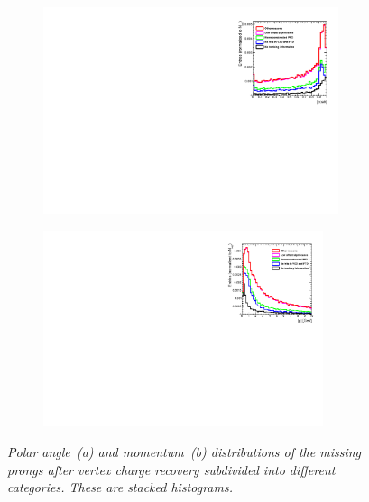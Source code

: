 \begin{figure}[h]
\centering
\begin{subfigure}{0.5\textwidth}
    \includegraphics[width=0.95\textwidth]{ILD/plots/recovery-missed-cos.pdf}
\caption{\label{fig:RecoveryMissingTracks_cos_3} }
\end{subfigure}%
  \begin{subfigure}{0.5\textwidth}
\centering
    \includegraphics[width=0.9\textwidth]{ILD/plots/recovery-missed-p.pdf}
\caption{\label{fig:RecoveryMissingTracks_p_3} }
\end{subfigure}
    \caption{\sl Polar angle~(a) and momentum~(b) distributions of the missing prongs after vertex charge recovery subdivided into different categories. These are stacked histograms. }
    \label{fig:RecoveryMissingTracks_3}
\end{figure}

